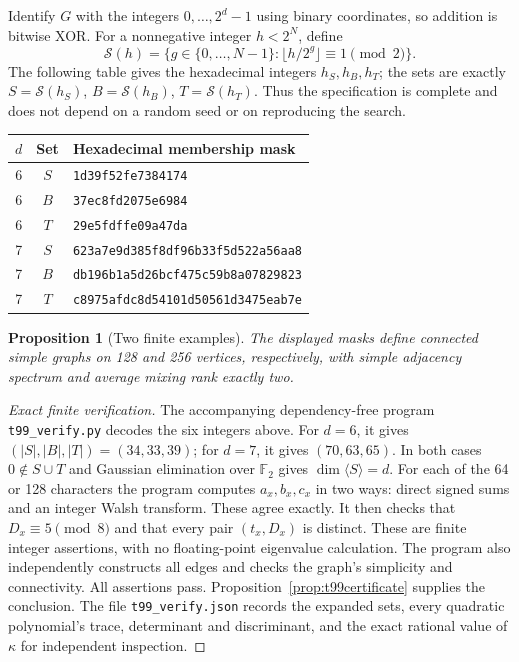 \documentclass[11pt,a4paper]{article}
\newtheorem{proposition}[theorem]{Proposition}
\theoremstyle{definition}
\theoremstyle{remark}
\begin{document}
Identify $G$ with the integers $0,\ldots,2^d-1$ using binary coordinates,
so addition is bitwise XOR. For a nonnegative integer $h<2^N$, define
\[
 \mathcal S(h)=\{g\in\{0,\ldots,N-1\}:
                \lfloor h/2^g\rfloor\equiv1\pmod2\}.
\]
The following table gives the hexadecimal integers $h_S,h_B,h_T$;
the sets are exactly $S=\mathcal S(h_S)$, $B=\mathcal S(h_B)$,
$T=\mathcal S(h_T)$. Thus the specification is complete and does not
depend on a random seed or on reproducing the search.

\begin{center}
\begin{tabular}{ccl}
\toprule
$d$ & Set & Hexadecimal membership mask\\
\midrule
6 & $S$ & \texttt{1d39f52fe7384174}\\
6 & $B$ & \texttt{37ec8fd2075e6984}\\
6 & $T$ & \texttt{29e5fdffe09a47da}\\
\midrule
7 & $S$ & \texttt{623a7e9d385f8df96b33f5d522a56aa8}\\
7 & $B$ & \texttt{db196b1a5d26bcf475c59b8a07829823}\\
7 & $T$ & \texttt{c8975afdc8d54101d50561d3475eab7e}\\
\bottomrule
\end{tabular}
\end{center}

\begin{proposition}[Two finite examples]
The displayed masks define connected simple graphs on 128 and 256
vertices, respectively, with simple adjacency spectrum and average
mixing rank exactly two.
\end{proposition}

\begin{proof}[Exact finite verification]
The accompanying dependency-free program \texttt{t99\_verify.py}
decodes the six integers above. For $d=6$, it gives
$(|S|,|B|,|T|)=(34,33,39)$; for $d=7$, it gives $(70,63,65)$.
In both cases $0\notin S\cup T$ and Gaussian elimination over
$\mathbb F_2$ gives $\dim\langle S\rangle=d$.
For each of the 64 or 128 characters the program computes $a_x,b_x,c_x$
in two ways: direct signed sums and an integer Walsh transform. These
agree exactly. It then checks that $D_x\equiv5\pmod8$ and that every
pair $(t_x,D_x)$ is distinct. These are finite integer assertions, with
no floating-point eigenvalue calculation. The program also independently
constructs all edges and checks the graph's simplicity and connectivity.
All assertions pass. Proposition~\ref{prop:t99certificate} supplies the
conclusion. The file \texttt{t99\_verify.json} records the expanded sets,
every quadratic polynomial's trace, determinant and discriminant, and
the exact rational value of $\kappa$ for independent inspection.
\end{proof}
\end{document}
